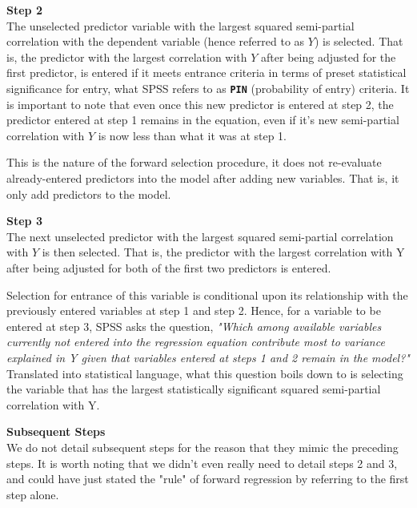 \documentclass[a4paper,12pt]{article}
\begin{document}
\textbf{Step 2}\\
The unselected predictor variable with the largest squared semi-partial correlation with the dependent variable (hence referred to as $Y$) is selected. That is, the predictor with the largest correlation with $Y$ after being adjusted for the first predictor, is entered if it meets entrance criteria in terms of preset statistical significance for entry, what SPSS refers to as
\textbf{\texttt{PIN}} (probability of entry) criteria. 
It is important to note that even once this new predictor is entered at step 2, the predictor entered at step 1 remains in the equation, even if it's new semi-partial correlation with $Y$ is now less than what it was at step 1. 

This is the nature of the forward selection procedure, it does not re-evaluate already-entered predictors into the model after adding new variables. That is, it only add predictors to the model. 

\textbf{Step 3}\\
The next unselected predictor with the largest squared semi-partial correlation with $Y$ is then selected. That is, the predictor with the largest correlation with Y after being adjusted for both of the first two predictors is entered. 

Selection for entrance of this variable is conditional upon its relationship with the previously entered variables at step 1 and step 2. Hence, for a variable to be entered at step 3, SPSS asks the question, \textit{"Which among available variables currently not entered into the regression equation contribute most to variance explained in Y given that variables entered at steps 1 and 2 remain in the model?"} Translated into statistical language, what this question boils down to is selecting the variable that has the largest statistically significant squared semi-partial correlation with Y.

\textbf{Subsequent Steps } \\
We do not detail subsequent steps for the reason that they mimic the preceding steps. It is worth noting that we didn't even really need to detail steps 2 and 3, and could have just stated the "rule" of forward regression by referring to the first step alone. 
\end{document}
